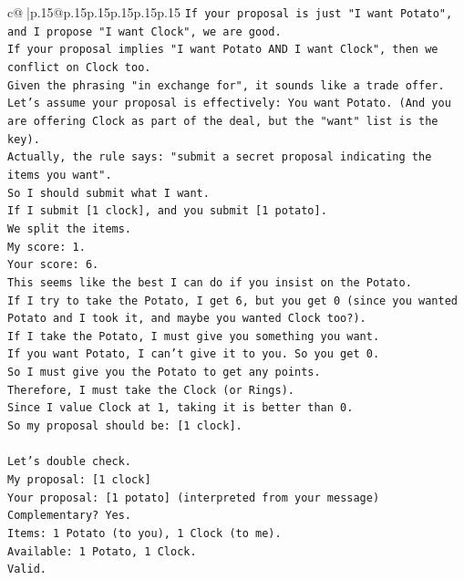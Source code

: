 \documentclass{article}
\begin{document}
{\begin{supertabular}{c@{$\;$}|p{.15\linewidth}@{}p{.15\linewidth}p{.15\linewidth}p{.15\linewidth}p{.15\linewidth}p{.15\linewidth}}
{{{\texttt{If your proposal is just "I want Potato", and I propose "I want Clock", we are good.} \\
\texttt{If your proposal implies "I want Potato AND I want Clock", then we conflict on Clock too.} \\
\texttt{Given the phrasing "in exchange for", it sounds like a trade offer.} \\
\texttt{Let's assume your proposal is effectively: You want Potato. (And you are offering Clock as part of the deal, but the "want" list is the key).} \\
\texttt{Actually, the rule says: "submit a secret proposal indicating the items you want".} \\
\texttt{So I should submit what I want.} \\
\texttt{If I submit {[}1 clock{]}, and you submit {[}1 potato{]}.} \\
\texttt{We split the items.} \\
\texttt{My score: 1.} \\
\texttt{Your score: 6.} \\
\texttt{This seems like the best I can do if you insist on the Potato.} \\
\texttt{If I try to take the Potato, I get 6, but you get 0 (since you wanted Potato and I took it, and maybe you wanted Clock too?).} \\
\texttt{If I take the Potato, I must give you something you want.} \\
\texttt{If you want Potato, I can't give it to you. So you get 0.} \\
\texttt{So I must give you the Potato to get any points.} \\
\texttt{Therefore, I must take the Clock (or Rings).} \\
\texttt{Since I value Clock at 1, taking it is better than 0.} \\
\texttt{So my proposal should be: {[}1 clock{]}.} \\
\\ 
\texttt{Let's double check.} \\
\texttt{My proposal: {[}1 clock{]}} \\
\texttt{Your proposal: {[}1 potato{]} (interpreted from your message)} \\
\texttt{Complementary? Yes.} \\
\texttt{Items: 1 Potato (to you), 1 Clock (to me).} \\
\texttt{Available: 1 Potato, 1 Clock.} \\
\texttt{Valid.} \\
}}}
\end{supertabular}}
\end{document}

